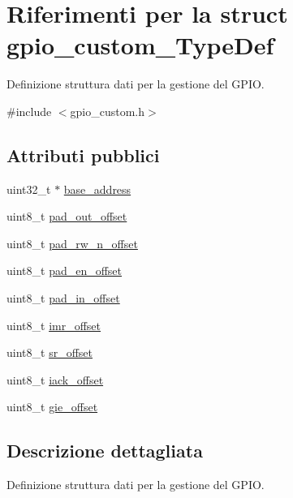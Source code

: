 \hypertarget{structgpio__custom___type_def}{}\section{Riferimenti per la struct gpio\+\_\+custom\+\_\+\+Type\+Def}
\label{structgpio__custom___type_def}


Definizione struttura dati per la gestione del G\+P\+IO.  




{\ttfamily \#include $<$gpio\+\_\+custom.\+h$>$}

\subsection*{Attributi pubblici}
\begin{DoxyCompactItemize}
\item 
uint32\+\_\+t $\ast$ \hyperlink{structgpio__custom___type_def_ad27f63e553c421cfd3f4353e44e2730c}{base\+\_\+address}
\item 
uint8\+\_\+t \hyperlink{structgpio__custom___type_def_aff972444f01c9a62a3406f68a135dbde}{pad\+\_\+out\+\_\+offset}
\item 
uint8\+\_\+t \hyperlink{structgpio__custom___type_def_a4390c6ba1b5edf3651577c4588fd46a6}{pad\+\_\+rw\+\_\+n\+\_\+offset}
\item 
uint8\+\_\+t \hyperlink{structgpio__custom___type_def_a2acf047838d804ed71c46b9c305e651c}{pad\+\_\+en\+\_\+offset}
\item 
uint8\+\_\+t \hyperlink{structgpio__custom___type_def_a506ff6030cded799ee3ee361b1fb4e05}{pad\+\_\+in\+\_\+offset}
\item 
uint8\+\_\+t \hyperlink{structgpio__custom___type_def_adcb3a20532084b02d7af698ae73c3c9f}{imr\+\_\+offset}
\item 
uint8\+\_\+t \hyperlink{structgpio__custom___type_def_afd636112e1d82c5c047672f6822c4791}{sr\+\_\+offset}
\item 
uint8\+\_\+t \hyperlink{structgpio__custom___type_def_a19aace2e656510f2de58623aef9640db}{iack\+\_\+offset}
\item 
uint8\+\_\+t \hyperlink{structgpio__custom___type_def_acfe1beb8be446fbf8cf25f972f8d94bc}{gie\+\_\+offset}
\end{DoxyCompactItemize}


\subsection{Descrizione dettagliata}
Definizione struttura dati per la gestione del G\+P\+IO. 

